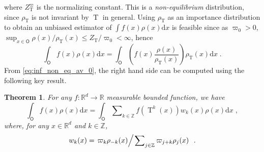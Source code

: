 \documentclass{article}
\newtheorem{theorem}{Theorem}
\def\transfo{\operatorname{T}}
\def\rmd{\operatorname{d}\hspace{-2pt}}
\def\rset{\mathbb{R}}
\def\dummy{f}
\def\rmd{\mathrm{d}}
\def\eqsp{\,}
\def\eqsp{\;}
\newcommand{\1}{\mathds{1}}
\def\proposal{\rho}
\def\const{Z}
\def\mso{\mathsf{O}}
\def\rset{\mathbb{R}}
\def\zset{\mathbb{Z}}
\def\rmd{\mathrm{d}}
\def\rhoT{\rho_{\transfo}}
\def\constT{\const_{\transfo}}
\begin{document}
where $\constT^{\varpi}$ is the normalizing constant.
This is a \textit{non-equilibrium} distribution, since $\rhoT$ is not invariant by $\transfo$ in general.
Using $\rhoT$ as an importance distribution to obtain an unbiased estimator of $\int \dummy(x) \proposal(x) \rmd x$ is feasible since as $\varpi_0>0$,  $\sup_{x \in \mso} \proposal(x)/\rhoT(x) \leq \constT/\varpi_0 < \infty$, hence
\[
\int_\mso \dummy(x) \rho(x)  \rmd x =\int_\mso \left(\dummy(x) \frac{\rho(x)}{\rhoT(x)}\right) \rhoT(x)  \rmd x\eqsp.
\]
From \eqref{eq:inf_non_eq_av_0}, the right hand side can be computed using the following key result.
\begin{theorem}
 \label{theo:inf_non_eq}
 For any $f:\rset^d \to \rset$ measurable bounded function, we have
\begin{equation}
\label{eq:key-relation-ft}
\int_{\mso} \dummy(x) \rho(x)  \rmd x =
\int_{\mso} \sum\nolimits_{k\in\zset}  \dummy(\transfo^{k}(x)) w_k(x) \rho(x)  \rmd x \eqsp,
\end{equation}
where, for any $x \in \rset^d$ and $k \in\zset$,
\begin{equation}
  \label{eq:def_w_k_stop}
    w_{k}(x) =  \left.  \varpi_k\rho_{-k}(x) \middle / \left. \sum\nolimits_{j\in\zset} \varpi_{j+k}\rho_{j}(x) \right. \right. \eqsp.
\end{equation}
\end{theorem}
\end{document}
